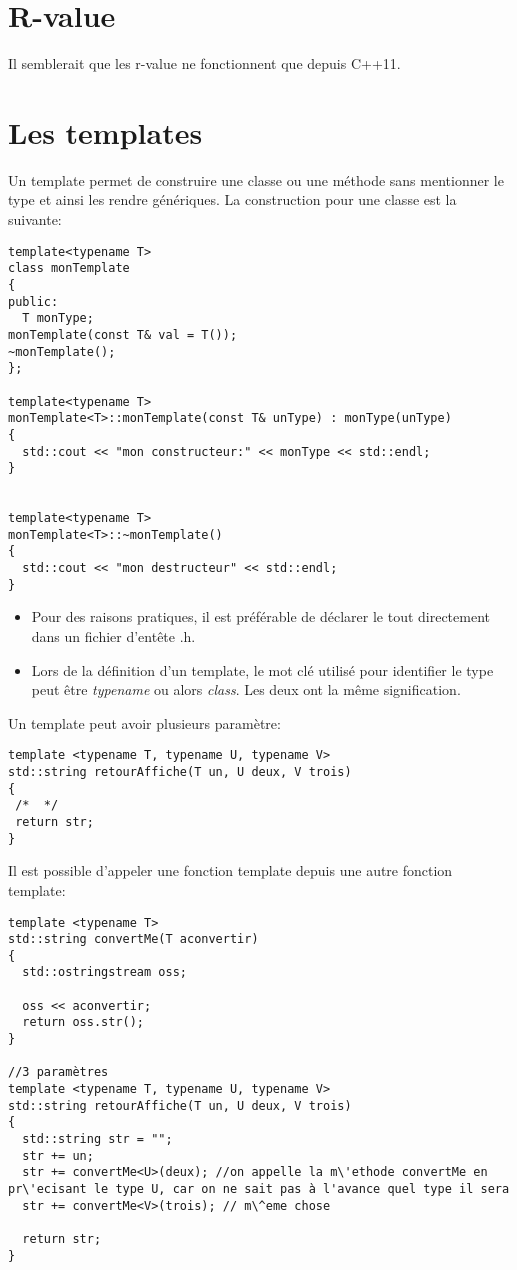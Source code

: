 \documentclass[onecolumn]{book}%
\makeatletter
\newcommand{\newdef}[1]{#1\index{#1@\textsc{#1}}}
\makeatother
\begin{document}
\section{R-value}
Il semblerait que les \newdef{r-value} ne fonctionnent que depuis C++11.
\section{Les templates}
Un \newdef{template} permet de construire une classe ou une m\'ethode sans mentionner le type et ainsi les rendre g\'en\'eriques.
La construction pour une classe est la suivante:
\begin{framed}
\begin{lstlisting}
template<typename T>
class monTemplate
{
public:
  T monType;
monTemplate(const T& val = T());
~monTemplate();
};

template<typename T>
monTemplate<T>::monTemplate(const T& unType) : monType(unType)
{
  std::cout << "mon constructeur:" << monType << std::endl;
}


template<typename T>
monTemplate<T>::~monTemplate()
{
  std::cout << "mon destructeur" << std::endl;
}
\end{lstlisting}
\end{framed}
\begin{itemize}
\item Pour des raisons pratiques, il est pr\'ef\'erable de d\'eclarer le tout directement dans un fichier d'ent\^ete .h.
\item Lors de la d\'efinition d'un template, le mot cl\'e utilis\'e pour identifier le type peut \^etre \emph{typename} ou alors \emph{class}. Les deux ont la m\^eme signification.
\end{itemize}
Un template peut avoir plusieurs paramètre:
\begin{framed}
\begin{lstlisting}
template <typename T, typename U, typename V>
std::string retourAffiche(T un, U deux, V trois)
{
 /*  */
 return str;
}
\end{lstlisting}
\end{framed}
Il est possible d'appeler une fonction template depuis une autre fonction template:
\begin{framed}
\begin{lstlisting}
template <typename T>
std::string convertMe(T aconvertir)
{
  std::ostringstream oss;
  
  oss << aconvertir;
  return oss.str();
}

//3 paramètres
template <typename T, typename U, typename V>
std::string retourAffiche(T un, U deux, V trois)
{
  std::string str = "";
  str += un;
  str += convertMe<U>(deux); //on appelle la m\'ethode convertMe en pr\'ecisant le type U, car on ne sait pas à l'avance quel type il sera
  str += convertMe<V>(trois); // m\^eme chose
  
  return str;
}
\end{lstlisting}
\end{framed}
\end{document}
